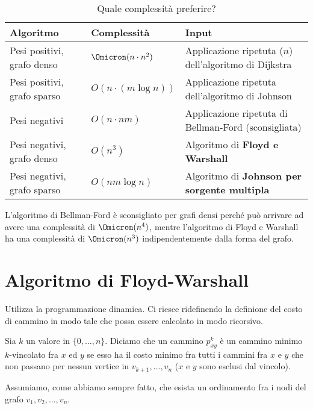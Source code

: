 \begin{table}[!ht]
\caption{Quale complessità preferire?}%
\label{tab:complexity-compared}
\begin{tabularx}{\textwidth}{@{} *{3}{l} @{}}
	\toprule
	\textbf{Algoritmo} & \textbf{Complessità} & \textbf{Input}\\
	\midrule
	Pesi positivi, grafo denso & \(\Omicron(n \cdot n^2)\) & Applicazione ripetuta (\(n\)) dell'algoritmo di Dijkstra \\
	\lightrule
	Pesi positivi, grafo sparso & \(O(n \cdot (m \log n))\) & Applicazione ripetuta dell'algoritmo di Johnson \\
	\lightrule
	Pesi negativi & \(O(n \cdot nm)\) & Applicazione ripetuta di Bellman-Ford (sconsigliata) \\
	\lightrule
	Pesi negativi, grafo denso & \(O(n^3)\) & Algoritmo di \textbf{Floyd e Warshall} \\
	\lightrule
	Pesi negativi, grafo sparso & \(O(nm \log n)\) & Algoritmo di \textbf{Johnson per sorgente multipla}\\
	\bottomrule
\end{tabularx}
\end{table}

L'algoritmo di Bellman-Ford è sconsigliato per grafi densi perché può arrivare ad avere una complessità di \(\Omicron(n^4)\), mentre l'algoritmo di Floyd e Warshall ha una complessità di \(\Omicron(n^3)\) indipendentemente dalla forma del grafo.

\newpage
\section{Algoritmo di Floyd-Warshall}

Utilizza la programmazione dinamica.
Ci riesce ridefinendo la definione del costo di cammino in modo tale che possa essere calcolato in modo ricorsivo.

\begin{definition}
Sia \(k\) un valore in \(\{0, \dots, n\}\).
Diciamo che un cammino \(p_{xy}^{k}\) è un cammino minimo \(k\)-vincolato fra \(x\) ed \(y\) se esso ha il costo minimo fra tutti i cammini fra \(x\) e \(y\) che non passano per nessun vertice in \(v_{k+1}, \dots, v_n\) (\(x\) e \(y\) sono esclusi dal vincolo).
\end{definition}

\begin{note}
Assumiamo, come abbiamo sempre fatto, che esista un ordinamento fra i nodi del grafo \(v_1, v_2, \dots, v_n\).
\end{note}

